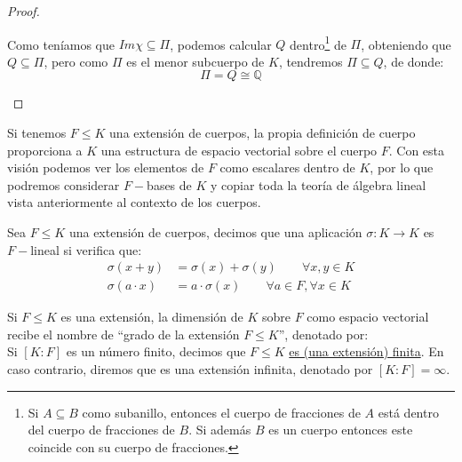 \begin{prop}
\begin{proof}
\begin{description}
                Como teníamos que $Im\chi \subseteq \Pi$, podemos calcular $Q$ dentro\footnote{Si $A\subseteq B$ como subanillo, entonces el cuerpo de fracciones de $A$ está dentro del cuerpo de fracciones de $B$. Si además $B$ es un cuerpo entonces este coincide con su cuerpo de fracciones.} de $\Pi$, obteniendo que $Q\subseteq \Pi$, pero como $\Pi$ es el menor subcuerpo de $K$, tendremos $\Pi\subseteq Q$, de donde:
                \begin{equation*}
                    \Pi = Q\cong \mathbb{Q}
                \end{equation*}
        \end{description}
    \end{proof}
\end{prop}

\begin{observacion}
    Si tenemos $F\leq K$ una extensión de cuerpos, la propia definición de cuerpo proporciona a $K$ una estructura de espacio vectorial sobre el cuerpo $F$. Con esta visión podemos ver los elementos de $F$ como escalares dentro de $K$, por lo que podremos considerar $F-$bases de $K$ y copiar toda la teoría de álgebra lineal vista anteriormente al contexto de los cuerpos.
\end{observacion}

\begin{definicion}
    Sea $F\leq K$ una extensión de cuerpos, decimos que una aplicación $\sigma:K\to K$ es $F-$lineal si verifica que:
    \begin{align*}
        \sigma(x+y) &= \sigma(x) + \sigma(y) \qquad \forall x,y\in K \\
        \sigma(a\cdot x) &= a\cdot \sigma(x) \qquad \forall a\in F, \forall x\in K
    \end{align*}
\end{definicion}

\begin{definicion}
    Si $F\leq K$ es una extensión, la dimensión de $K$ sobre $F$ como espacio vectorial recibe el nombre de ``grado de la extensión $F\leq K$'', denotado por: 
    \begin{equation*}
        [K:F]
    \end{equation*}
    Si $[K:F]$ es un número finito, decimos que $F\leq K$ \underline{es (una extensión) finita}. En caso contrario, diremos que es una extensión infinita, denotado por $[K:F] = \infty$.
\end{definicion}

